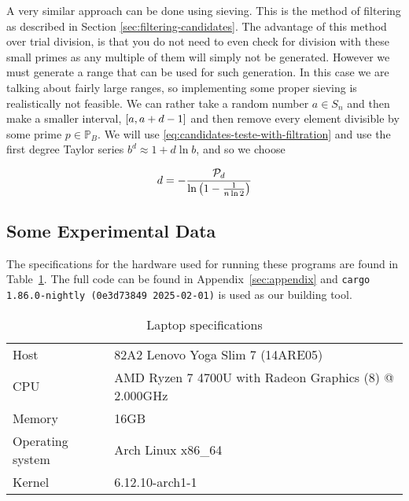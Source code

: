   A very similar approach can be done using sieving.
  This is the method of filtering as described in Section \ref{sec:filtering-candidates}.
  The advantage of this method over trial division, is that you do not need to even check for division with these small primes as any multiple of them will simply not be generated.
  However we must generate a range that can be used for such generation.
  In this case we are talking about fairly large ranges, so implementing some proper sieving is realistically not feasible.
  We can rather take a random number $a \in S_n$ and then make a smaller interval, $\left[  a, a+d-1  \right]$ and then remove every element divisible by some prime $p \in \mathbb{P}_B$.
  We will use \eqref{eq:candidates-teste-with-filtration} and use the first degree Taylor series $b^d \approx 1 + d \ln b$, and so we choose

  \begin{equation}
    d =  - \frac{\mathcal{P}_d}{\ln \left(  1 - \frac{1}{n \ln 2}  \right)}
    \label{eq:filtration-constant}
  \end{equation}


\subsection{Some Experimental Data}

  The specifications for the hardware used for running these programs are found in Table~\ref{tab:specs}.
  The full code can be found in Appendix~\ref{sec:appendix} and \texttt{cargo 1.86.0-nightly (0e3d73849 2025-02-01)} is used as our building tool.

  \begin{table}
    \begin{center}
      \begin{tabular}[c]{l|l}
        \hline
        Host & 82A2 Lenovo Yoga Slim 7 (14ARE05) \\
        CPU & AMD Ryzen 7 4700U with Radeon Graphics (8) @ 2.000GHz \\        
        Memory & 16GB \\
        Operating system & Arch Linux x86\_64 \\
        Kernel & 6.12.10-arch1-1 \\
        \hline
      \end{tabular}
    \end{center}
    \caption{Laptop specifications}\label{tab:specs}
  \end{table}


